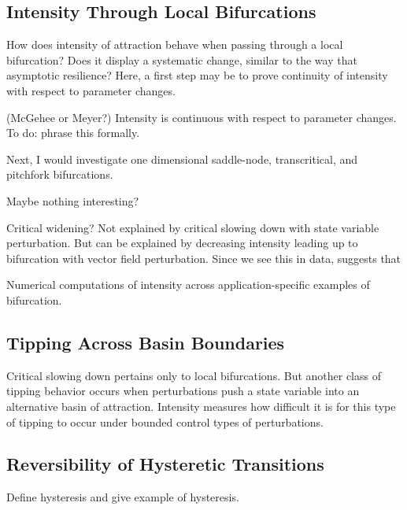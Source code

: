 
\subsection{Intensity Through Local Bifurcations}

How does intensity of attraction behave when passing through a local bifurcation? Does it display a systematic change, similar to the way that asymptotic resilience? Here, a first step may be to prove continuity of intensity with respect to parameter changes. 

\begin{conjecture}(McGehee or Meyer?)
	Intensity is continuous with respect to parameter changes. To do: phrase this formally.
\end{conjecture}

Next, I would investigate one dimensional saddle-node, transcritical, and pitchfork bifurcations. 

Maybe nothing interesting?

Critical widening? Not explained by critical slowing down with state variable perturbation. But can be explained by decreasing intensity leading up to bifurcation with vector field perturbation. Since we see this in data, suggests that 

Numerical computations of intensity across application-specific examples of bifurcation. 

\subsection{Tipping Across Basin Boundaries}

Critical slowing down pertains only to local bifurcations. But another class of tipping behavior occurs when perturbations push a state variable into an alternative basin of attraction. Intensity measures how difficult it is for this type of tipping to occur under bounded control types of perturbations. 

\subsection{Reversibility of Hysteretic Transitions}

Define hysteresis and give example of hysteresis. 

